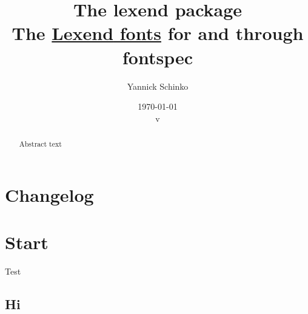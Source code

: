 \documentclass[12pt,oneside,a4paper]{ltxdoc}
\begin{document}
\title{
	The \textsf{lexend} package\\
	\small{The \href{https://www.lexend.com/}{\textsf{Lexend} fonts} for  and  through \textsf{fontspec}}
}
\author{
	Yannick Schinko
}
\date{
	\today\\
	v%
}

\maketitle

\begin{abstract}
Abstract text
\end{abstract}
\newpage

\tableofcontents
\newpage


\section{Changelog}


\section{Start}

Test

\subsection{Hi}
\end{document}
